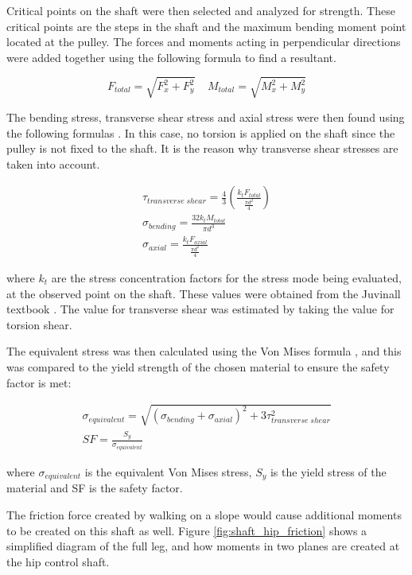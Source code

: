 Critical points on the shaft were then selected and analyzed for strength. These critical points are the steps in the shaft and the maximum bending moment point located at the pulley. The forces and moments acting in perpendicular directions were added together using the following formula to find a resultant.

\begin{equation}
    F_{total}=\sqrt{F_x^2+F_y^2}
    \;\;\;\;
    M_{total}=\sqrt{M_x^2+M_y^2} \label{eq:Ftotal}
\end{equation}{}

The bending stress, transverse shear stress and axial stress were then found using the following formulas \cite{juvinall_fundamentals_2012}. In this case, no torsion is applied on the shaft since the pulley is not fixed to the shaft. It is the reason why transverse shear stresses are taken into account.

\begin{gather}
    \tau_{transverse\;shear}=\frac{4}{3} (\frac{k_t F_{total}}{\frac{\pi{}d^2}{4}})
    \\
    \sigma_{bending}=\frac{32k_tM_{total}}{\pi{}d^3} \label{eq:shaft_bending_stress}
    \\
    \sigma_{axial}=\frac{k_tF_{axial}}{\frac{\pi{}d^2}{4}} \label{eq:shaft_axial_stress}
\end{gather}

where $k_t$ are the stress concentration factors for the stress mode being evaluated, at the observed point on the shaft. These values were obtained from the Juvinall textbook \cite{juvinall_fundamentals_2012}. The value for transverse shear was estimated by taking the value for torsion shear. 

The equivalent stress was then calculated using the Von Mises formula \cite{juvinall_fundamentals_2012}, and this was compared to the yield strength of the chosen material to ensure the safety factor is met:

\begin{gather}
    \sigma_{equivalent}=\sqrt{(\sigma_{bending}+\sigma_{axial})^2+3\tau_{transverse\;shear}^2}
    \\
    SF=\frac{S_y}{\sigma_{equivalent}}
\end{gather}

where $\sigma_{equivalent}$ is the equivalent Von Mises stress, $S_y$ is the yield stress of the material and SF is the safety factor.

The friction force created by walking on a slope would cause additional moments to be created on this shaft as well. Figure \ref{fig:shaft_hip_friction} shows a simplified diagram of the full leg, and how moments in two planes are created at the hip control shaft.

